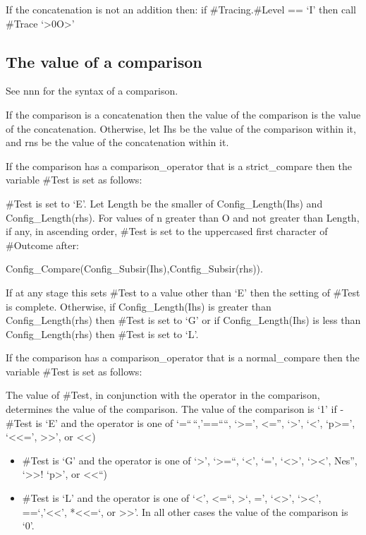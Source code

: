 If the concatenation is not an addition then: if \#Tracing.\#Level ==
`I' then call \#Trace `\textgreater0O\textgreater{}'

\subsection{The value of a comparison}\label{the-value-of-a-comparison}

See nnn for the syntax of a comparison.

If the comparison is a concatenation then the value of the comparison is
the value of the concatenation. Otherwise, let Ihs be the value of the
comparison within it, and rns be the value of the concatenation within
it.

If the comparison has a comparison\_operator that is a strict\_compare
then the variable \#Test is set as follows:

\#Test is set to `E'. Let Length be the smaller of Config\_Length(Ihs)
and Config\_Length(rhs). For values of n greater than O and not greater
than Length, if any, in ascending order, \#Test is set to the uppercased
first character of \#Outcome after:

Config\_Compare(Config\_Subsir(Ihs),Contfig\_Subsir(rhs)).

If at any stage this sets \#Test to a value other than `E' then the
setting of \#Test is complete. Otherwise, if Config\_Length(Ihs) is
greater than Config\_Length(rhs) then \#Test is set to `G' or if
Config\_Length(Ihs) is less than Config\_Length(rhs) then \#Test is set
to `L'.

If the comparison has a comparison\_operator that is a normal\_compare
then the variable \#Test is set as follows:


The value of \#Test, in conjunction with the operator in the comparison,
determines the value of the comparison. The value of the comparison is
`1' if - \#Test is `E' and the operator is one of `=``\,``,'==````,
`\textgreater=', \textless='', `\textgreater{}', `\textless{}',
`p\textgreater=', `\textless\textless=', \textgreater\textgreater', or
\textless\textless)

\begin{itemize}
\tightlist
\item
  \#Test is `G' and the operator is one of `\textgreater{}',
  `\textgreater=``, `\textless{}', `=', `\textless\textgreater{}',
  `\textgreater\textless{}', Nes'', `\textgreater\textgreater!
  `p\textgreater{}', or \textless\textless``)
\item
  \#Test is `L' and the operator is one of `\textless{}', \textless=``,
  \textgreater{}`, =', `\textless\textgreater{}',
  `\textgreater\textless{}', ==`,'\textless\textless',
  *\textless\textless=`, or \textgreater\textgreater{}'. In all other
  cases the value of the comparison is `0'.
\end{itemize}


